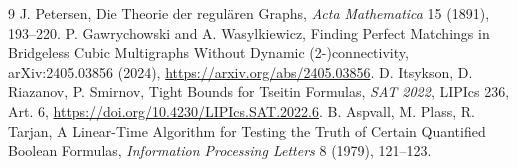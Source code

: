 \documentclass[11pt]{article}
\begin{document}
\begin{thebibliography}{9}
 J. Petersen, Die Theorie der regul\"aren Graphs, \emph{Acta Mathematica} 15 (1891), 193--220.
 P. Gawrychowski and A. Wasylkiewicz, Finding Perfect Matchings in Bridgeless Cubic Multigraphs Without Dynamic (2-)connectivity, arXiv:2405.03856 (2024), \url{https://arxiv.org/abs/2405.03856}.
 D. Itsykson, D. Riazanov, P. Smirnov, Tight Bounds for Tseitin Formulas, \emph{SAT 2022}, LIPIcs 236, Art. 6, \url{https://doi.org/10.4230/LIPIcs.SAT.2022.6}.
 B. Aspvall, M. Plass, R. Tarjan, A Linear-Time Algorithm for Testing the Truth of Certain Quantified Boolean Formulas, \emph{Information Processing Letters} 8 (1979), 121--123.
\end{thebibliography}
\end{document}
